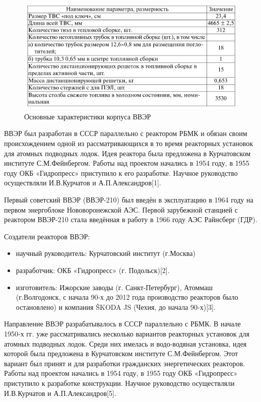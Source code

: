 \documentclass[14pt]{article}
\begin{document}
\begin{figure}
	    \centering
	    \includegraphics[width=\linewidth]{Picture6}
	    \caption{Основные характеристики корпуса ВВЭР}
	    \label{fig:my_label}
	\end{figure}

ВВЭР был разработан в СССР параллельно с реактором РБМК и обязан своим происхождением одной из рассматривающихся в то время реакторных установок для атомных подводных лодок. Идея реактора была предложена в Курчатовском институте С.М.Фейнбергом. Работы над проектом начались в 1954 году, в 1955 году ОКБ «Гидропресс» приступило к его разработке. Научное руководство осуществляли И.В.Курчатов и А.П.Александров[1]. 

Первый советский ВВЭР (ВВЭР-210) был введён в эксплуатацию в 1964 году на первом энергоблоке Нововоронежской АЭС. Первой зарубежной станцией с реактором ВВЭР-210 стала введённая в работу в 1966 году АЭС Райнсберг (ГДР). 

Создатели реакторов ВВЭР: 
\begin{itemize}
\item научный руководитель: Курчатовский институт (г.Москва)
\item разработчик: ОКБ «Гидропресс» (г. Подольск)[2].
\item изготовитель: Ижорские заводы (г. Санкт-Петербург), Атоммаш (г.Волгодонск, с начала 90-х до 2012 года производство реакторов было остановлено) и компания ŠKODA JS (Чехия, до начала 90-х)[3].
	\end{itemize}
	
	Направление ВВЭР разрабатывалось в СССР параллельно с РБМК. В начале 1950-х гг. уже рассматривались несколько вариантов реакторных установок для атомных подводных лодок. Среди них имелась и водо-водяная установка, идея которой была предложена в Курчатовском институте С.М.Фейнбергом. Этот вариант был принят и для разработки гражданских энергетических реакторов. Работы над проектом начались в 1954 году, в 1955 году ОКБ «Гидропресс» приступило к разработке конструкции. Научное руководство осуществляли И.В.Курчатов и А.П.Александров[5].
	
\end{document}
